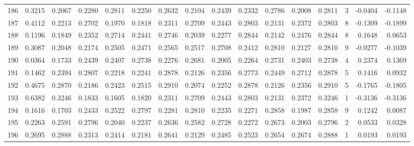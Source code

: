 \begin{tabular}{lrrrrrrrrrrrrrrr}
186 &      0.3215 &  0.2067 &  0.2280 &  0.2811 &  0.2250 &  0.2632 &  0.2104 &  0.2439 &  0.2332 &  0.2786 &   0.2008 &     0.2811 &      3 &                   -0.0404 &                    -0.1148 \\
187 &      0.4112 &  0.2213 &  0.2702 &  0.1970 &  0.1818 &  0.2311 &  0.2709 &  0.2443 &  0.2803 &  0.2131 &   0.2372 &     0.2803 &      8 &                   -0.1309 &                    -0.1899 \\
188 &      0.1196 &  0.1849 &  0.2352 &  0.2714 &  0.2441 &  0.2746 &  0.2039 &  0.2277 &  0.2844 &  0.2142 &   0.2476 &     0.2844 &      8 &                    0.1648 &                     0.0653 \\
189 &      0.3087 &  0.2048 &  0.2174 &  0.2505 &  0.2471 &  0.2565 &  0.2517 &  0.2708 &  0.2412 &  0.2810 &   0.2127 &     0.2810 &      9 &                   -0.0277 &                    -0.1039 \\
190 &      0.0364 &  0.1733 &  0.2439 &  0.2407 &  0.2738 &  0.2276 &  0.2681 &  0.2005 &  0.2264 &  0.2731 &   0.2403 &     0.2738 &      4 &                    0.2374 &                     0.1369 \\
191 &      0.1462 &  0.2394 &  0.2807 &  0.2218 &  0.2241 &  0.2878 &  0.2126 &  0.2356 &  0.2773 &  0.2449 &   0.2712 &     0.2878 &      5 &                    0.1416 &                     0.0932 \\
192 &      0.4675 &  0.2870 &  0.2186 &  0.2423 &  0.2515 &  0.2910 &  0.2074 &  0.2252 &  0.2878 &  0.2126 &   0.2356 &     0.2910 &      5 &                   -0.1765 &                    -0.1805 \\
193 &      0.6382 &  0.3246 &  0.1833 &  0.1605 &  0.1820 &  0.2311 &  0.2709 &  0.2443 &  0.2803 &  0.2131 &   0.2372 &     0.3246 &      1 &                   -0.3136 &                    -0.3136 \\
194 &      0.1616 &  0.1703 &  0.2433 &  0.2522 &  0.2797 &  0.2281 &  0.2810 &  0.2235 &  0.2271 &  0.2858 &   0.1987 &     0.2858 &      9 &                    0.1242 &                     0.0087 \\
195 &      0.2263 &  0.2591 &  0.2796 &  0.2040 &  0.2237 &  0.2636 &  0.2582 &  0.2728 &  0.2272 &  0.2673 &   0.2003 &     0.2796 &      2 &                    0.0533 &                     0.0328 \\
196 &      0.2695 &  0.2888 &  0.2313 &  0.2414 &  0.2181 &  0.2641 &  0.2129 &  0.2485 &  0.2523 &  0.2654 &   0.2674 &     0.2888 &      1 &                    0.0193 &                     0.0193 \\

\end{tabular}

